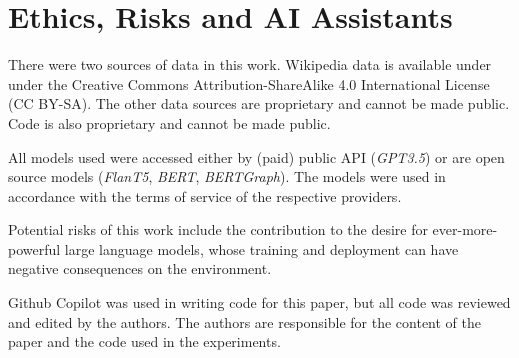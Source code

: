 \section*{Ethics, Risks and AI Assistants}

There were two sources of data in this work. Wikipedia data is available under under the Creative
Commons Attribution-ShareAlike 4.0 International License (CC BY-SA). The other data sources are proprietary and cannot be made public. Code is also proprietary and cannot be made public.

All models used were accessed either by (paid) public API (\emph{GPT3.5}) or are open source models (\emph{FlanT5}, \emph{BERT}, \emph{BERTGraph}). The models were used in accordance with the terms of service of the respective providers. 

Potential risks of this work include the contribution to the desire for ever-more-powerful large language models, whose training and deployment can have negative consequences on the environment.

Github Copilot was used in writing code for this paper, but all code was reviewed and edited by the authors. The authors are responsible for the content of the paper and the code used in the experiments.